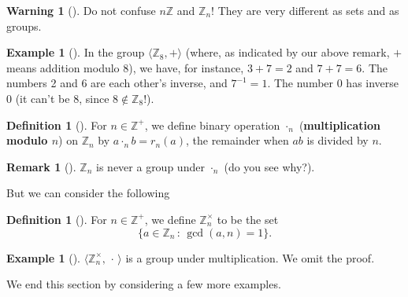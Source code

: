 \documentclass[10pt,]{book}
\newcommand{\terminology}[1]{\textbf{#1}}
\theoremstyle{plain}
\theoremstyle{definition}
\newtheorem{definition}[theorem]{Definition}
\theoremstyle{definition}
\newtheorem{remark}[theorem]{Remark}
\newtheorem{warning}[theorem]{Warning}
\theoremstyle{definition}
\newtheorem{example}[theorem]{Example}
\theoremstyle{definition}
\numberwithin{equation}{section}
\def\Z{\mathbb{Z}}
\begin{document}
\begin{warning}[]\label{warning-14}
Do not confuse \(n\Z\) and \(\Z_n\)! They are very different as sets and as groups.%
\end{warning}
\begin{example}[]\label{example-17}
In the group \(\langle \Z_8,+\rangle\) (where, as indicated by our above remark, \(+\) means addition modulo \(8\)), we have, for instance, \(3+7=2\) and \(7+7=6\). The numbers 2 and 6 are each other's inverse, and \(7^{-1}=1\). The number \(0\) has inverse \(0\) (it can't be \(8\), since \(8\not\in \Z_8\)!).%
\end{example}
\begin{definition}[{}]\label{definition-27}
For \(n\in \Z^+\), we define binary operation \(\cdot_n\) (\terminology{multiplication modulo \(n\)}) on \(\Z_n\) by \(a\cdot_n b = r_n(a)\), the remainder when \(ab\) is divided by \(n\).%
\end{definition}
\begin{remark}[]\label{remark-15}
\(\Z_n\) is never a group under \(\cdot_n\) (do you see why?).%
\end{remark}
But we can consider the following%
\begin{definition}[{}]\label{definition-28}
For \(n\in \Z^+\), we define \(\Z_n^{\times}\) to be the set%
\begin{equation*}
\{a\in \Z_n\,:\,\gcd(a,n)=1\}\text{.}
\end{equation*}
%
\end{definition}
\begin{example}[]\label{example-18}
\(\langle \Z_n^{\times},\,\cdot\, \rangle\) is a group under multiplication. We omit the proof.%
\end{example}
We end this section by considering a few more examples.%
\end{document}

